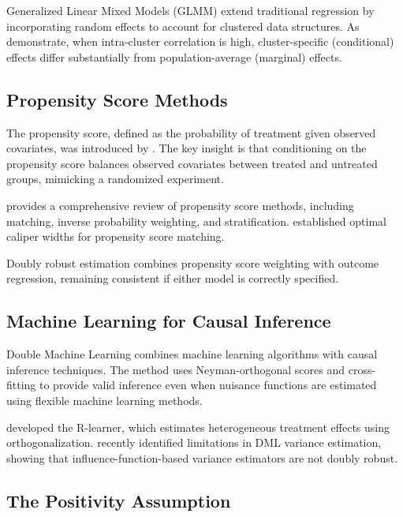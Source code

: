 Generalized Linear Mixed Models (GLMM) extend traditional regression by incorporating random effects to account for clustered data structures. As \citet{neuhaus1991comparison} demonstrate, when intra-cluster correlation is high, cluster-specific (conditional) effects differ substantially from population-average (marginal) effects.

\subsection{Propensity Score Methods}

The propensity score, defined as the probability of treatment given observed covariates, was introduced by \citet{rosenbaum1983central}. The key insight is that conditioning on the propensity score balances observed covariates between treated and untreated groups, mimicking a randomized experiment.

\citet{austin2011introduction} provides a comprehensive review of propensity score methods, including matching, inverse probability weighting, and stratification. \citet{austin2010optimal} established optimal caliper widths for propensity score matching.

Doubly robust estimation \citep{kang2007average} combines propensity score weighting with outcome regression, remaining consistent if either model is correctly specified.

\subsection{Machine Learning for Causal Inference}

Double Machine Learning \citep{chernozhukov2018double} combines machine learning algorithms with causal inference techniques. The method uses Neyman-orthogonal scores and cross-fitting to provide valid inference even when nuisance functions are estimated using flexible machine learning methods.

\citet{nie2021quasi} developed the R-learner, which estimates heterogeneous treatment effects using orthogonalization. \citet{wu2025why} recently identified limitations in DML variance estimation, showing that influence-function-based variance estimators are not doubly robust.

\subsection{The Positivity Assumption}

